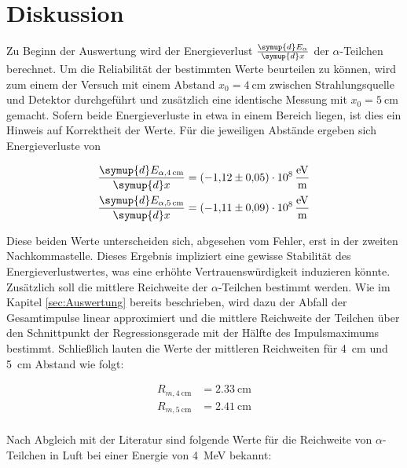 %

%
\section{Diskussion}
\label{sec:Diskussion}

Zu Beginn der Auswertung wird der Energieverlust $\frac{\symup{d}E_\alpha}{\symup{d}x}$ der $\alpha$-Teilchen berechnet.
Um die Reliabilität der bestimmten Werte beurteilen zu können, wird zum einem der Versuch mit einem Abstand $x_0 = \qty{4}{\centi\meter}$
zwischen Strahlungsquelle und Detektor durchgeführt und zusätzlich eine identische Messung mit $x_0 = \qty{5}{\centi\meter}$ gemacht.
Sofern beide Energieverluste in etwa in einem Bereich liegen, ist dies ein Hinweis auf Korrektheit der Werte. Für die jeweiligen 
Abstände ergeben sich Energieverluste von 

\begin{align}
    \frac{\symup{d}E_{\alpha\text{,}\qty{4}{\centi \meter}}}{\symup{d}x} &= \qty{-1.12 \pm 0.05e8}{\eV\per\meter} \\
    \frac{\symup{d}E_{\alpha\text{,}\qty{5}{\centi \meter}}}{\symup{d}x} &= \qty{-1.11 \pm 0.09e8}{\eV\per\meter}
\end{align}

\noindent Diese beiden Werte unterscheiden sich, abgesehen vom Fehler, erst in der zweiten Nachkommastelle. Dieses Ergebnis 
impliziert eine gewisse Stabilität des Energieverlustwertes, was eine erhöhte Vertrauenswürdigkeit induzieren könnte.\\

\noindent Zusätzlich soll die mittlere Reichweite der $\alpha$-Teilchen bestimmt werden. Wie im Kapitel \ref{sec:Auswertung} bereits 
beschrieben, wird dazu der Abfall der Gesamtimpulse linear approximiert und die mittlere Reichweite der Teilchen über den 
Schnittpunkt der Regressionsgerade mit der Hälfte des Impulsmaximums bestimmt. Schließlich lauten die Werte der mittleren 
Reichweiten für \qty{4}{\centi\meter} und \qty{5}{\centi\meter} Abstand wie folgt:

\begin{align}
    R_{m, \qty{4}{\centi \meter}} &= \qty{2.33}{\centi \meter} \\
    R_{m, \qty{5}{\centi \meter}} &= \qty{2.41}{\centi \meter} \\
\end{align}

\noindent Nach Abgleich mit der Literatur \cite{Reichweite_Strahlung} sind folgende Werte für die Reichweite von $\alpha$-Teilchen 
in Luft bei einer Energie von \qty{4}{\mega\eV} bekannt:

